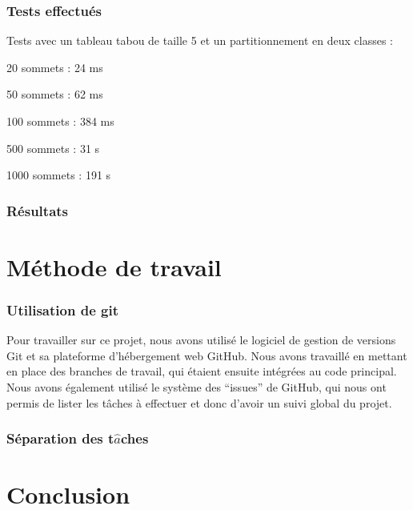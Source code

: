 \documentclass[12pt]{article}
\begin{document}
\section{Tests effectués}
Tests avec un tableau tabou de taille 5 et un partitionnement en deux classes :

20 sommets : 24 ms

50 sommets : 62 ms

100 sommets : 384 ms

500 sommets : 31 s

1000 sommets : 191 s

\section{Résultats}

\newpage

\part{Méthode de travail}
\section{Utilisation de git}
Pour travailler sur ce projet, nous avons utilisé le logiciel de gestion de versions Git et sa plateforme d’hébergement web GitHub. Nous avons travaillé en mettant en place des branches de travail, qui étaient ensuite intégrées au code principal. Nous avons également utilisé le système des “issues” de GitHub, qui nous ont permis de lister les tâches à effectuer et donc d’avoir un suivi global du projet.

\section{Séparation des t$\hat a$ches}


\part{Conclusion}
		
\end{document}
